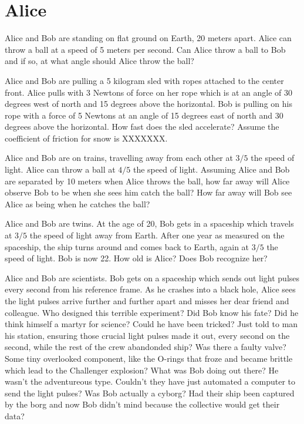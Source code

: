 
\chapter*{Alice}

Alice and Bob are standing on flat ground on Earth, 20 meters apart. Alice can throw a ball at a speed of 5 meters per second. Can Alice throw a ball to Bob and if so, at what angle should Alice throw the ball?

Alice and Bob are pulling a 5 kilogram sled with ropes attached to the center front. Alice pulls with 3 Newtons of force on her rope which is at an angle of 30 degrees west of north and 15 degrees above the horizontal. Bob is pulling on his rope with a force of 5 Newtons at an angle of 15 degrees east of north and 30 degrees above the horizontal. How fast does the sled accelerate? Assume the coefficient of friction for snow is XXXXXXX. 

Alice and Bob are on trains, travelling away from each other at $3/5$ the speed of light. Alice can throw a ball at $4/5$ the speed of light. Assuming Alice and Bob are separated by 10 meters when Alice throws the ball, how far away will Alice observe Bob to be when she sees him catch the ball? How far away will Bob see Alice as being when he catches the ball?

Alice and Bob are twins. At the age of 20, Bob gets in a spaceship which travels at $3/5$ the speed of light away from Earth. After one year as measured on the spaceship, the ship turns around and comes back to Earth, again at $3/5$ the speed of light. Bob is now 22. How old is Alice? Does Bob recognize her?

Alice and Bob are scientists. Bob gets on a spaceship which sends out light pulses every second from his reference frame. As he crashes into a black hole, Alice sees the light pulses arrive further and further apart and misses her dear friend and colleague. Who designed this terrible experiment? Did Bob know his fate? Did he think himself a martyr for science? Could he have been tricked? Just told to man his station, ensuring those crucial light pulses made it out, every second on the second, while the rest of the crew abandonded ship? Was there a faulty valve? Some tiny overlooked component, like the O-rings that froze and became brittle which lead to the Challenger explosion? What was Bob doing out there? He wasn't the adventureous type. Couldn't they have just automated a computer to send the light pulses? Was Bob actually a cyborg? Had their ship been captured by the borg and now Bob didn't mind because the collective would get their data?

